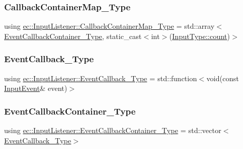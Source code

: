 \subsubsection{\texorpdfstring{Callback\+Container\+Map\+\_\+\+Type}{CallbackContainerMap\_Type}}
{\footnotesize\ttfamily using \mbox{\hyperlink{classec_1_1_input_listener_abf0825f1f31a1373c5c03e51da123148}{ec\+::\+Input\+Listener\+::\+Callback\+Container\+Map\+\_\+\+Type}} =  std\+::array$<$\mbox{\hyperlink{classec_1_1_input_listener_a0d9334fafd46399a39448fe00fad3c2e}{Event\+Callback\+Container\+\_\+\+Type}}, static\+\_\+cast$<$int$>$(\mbox{\hyperlink{namespaceec_a30e2a743ebdeb02ac68a6cfa50f629c7ae2942a04780e223b215eb8b663cf5353}{Input\+Type\+::count}})$>$}

\mbox{\label{classec_1_1_input_listener_aa622615b11dfc5cd1dce423fafe27c93}} 
\subsubsection{\texorpdfstring{Event\+Callback\+\_\+\+Type}{EventCallback\_Type}}
{\footnotesize\ttfamily using \mbox{\hyperlink{classec_1_1_input_listener_aa622615b11dfc5cd1dce423fafe27c93}{ec\+::\+Input\+Listener\+::\+Event\+Callback\+\_\+\+Type}} =  std\+::function$<$void(const \mbox{\hyperlink{structec_1_1_input_event}{Input\+Event}}\& event)$>$}

\mbox{\label{classec_1_1_input_listener_a0d9334fafd46399a39448fe00fad3c2e}} 
\subsubsection{\texorpdfstring{Event\+Callback\+Container\+\_\+\+Type}{EventCallbackContainer\_Type}}
{\footnotesize\ttfamily using \mbox{\hyperlink{classec_1_1_input_listener_a0d9334fafd46399a39448fe00fad3c2e}{ec\+::\+Input\+Listener\+::\+Event\+Callback\+Container\+\_\+\+Type}} =  std\+::vector$<$\mbox{\hyperlink{classec_1_1_input_listener_aa622615b11dfc5cd1dce423fafe27c93}{Event\+Callback\+\_\+\+Type}}$>$}

